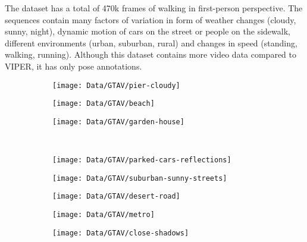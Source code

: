 			The dataset has a total of 470k frames of walking in first-person perspective.
			The sequences contain many factors of variation in form of weather changes (cloudy, sunny, night), dynamic motion of cars on the street or people on the sidewalk, different environments (urban, suburban, rural) and changes in speed (standing, walking, running).
			Although this dataset contains more video data compared to VIPER, it has only pose annotations.
			\begin{figure}
				\def\imheightv{2.2}
				\def\imheight{\imheightv cm}
				\def\imwidth{\fpeval{16/9*\imheightv}cm}
				\centering
				\begin{subfigure}[b]{0.33\linewidth}
					\centering
					\texttt{[image: Data/GTAV/pier-cloudy]}
				\end{subfigure}\hfill%
				\begin{subfigure}[b]{0.33\linewidth}
					\centering
					\texttt{[image: Data/GTAV/beach]}
				\end{subfigure}\hfill%
				\begin{subfigure}[b]{0.33\linewidth}
					\centering
					\texttt{[image: Data/GTAV/garden-house]}
				\end{subfigure}%
				\\
				\vspace{0.1cm}
				\begin{subfigure}[b]{0.33\linewidth}
					\centering
					\texttt{[image: Data/GTAV/parked-cars-reflections]}
				\end{subfigure}\hfill%
				\begin{subfigure}[b]{0.33\linewidth}
					\centering
					\texttt{[image: Data/GTAV/suburban-sunny-streets]}
				\end{subfigure}\hfill%
				\begin{subfigure}[b]{0.33\linewidth}
					\centering
					\texttt{[image: Data/GTAV/desert-road]}
				\end{subfigure}%
				\vspace{0.1cm}
				\begin{subfigure}[b]{0.33\linewidth}
					\centering
					\texttt{[image: Data/GTAV/metro]}
				\end{subfigure}\hfill%
				\begin{subfigure}[b]{0.33\linewidth}
					\centering
					\texttt{[image: Data/GTAV/close-shadows]}

\end{subfigure}
\end{figure}
